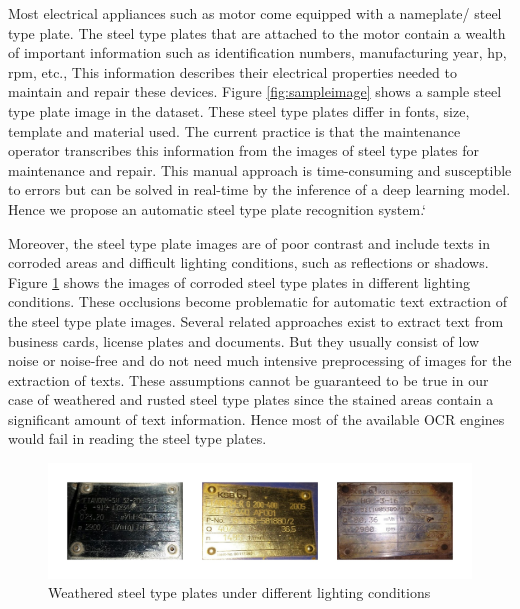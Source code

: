 		Most electrical appliances such as motor come equipped with a nameplate/ steel type plate. The steel type plates that are attached to the motor contain a wealth of important information such as identification numbers, manufacturing year, \gls{hp}, \gls{rpm}, etc., This information describes their electrical properties needed to maintain and repair these devices. Figure \ref{fig:sampleimage} shows a sample steel type plate image in the dataset. These steel type plates differ in fonts, size, template and material used. The current practice is that the maintenance operator transcribes this information from the images of steel type plates for maintenance and repair. This manual approach is time-consuming and susceptible to errors but can be solved in real-time by the inference of a deep learning model. Hence we propose an automatic steel type plate recognition system.`	
\newline		

	
		Moreover, the steel type plate images are of poor contrast and include texts in corroded areas and difficult lighting conditions, such as reflections or shadows. Figure \ref{fig:rusted} shows the images of corroded steel type plates in different lighting conditions. These occlusions become problematic for automatic text extraction of the steel type plate images. Several related approaches exist to extract text from business cards, license plates and documents. But they usually consist of low noise or noise-free and do not need much intensive preprocessing of images for the extraction of texts. These assumptions cannot be guaranteed to be true in our case of weathered and rusted steel type plates since the stained areas contain a significant amount of text information. Hence most of the available OCR engines would fail in reading the steel type plates.
\newline	
	 
\begin{figure}
\centering
\includegraphics[width=5.5in]{images/corrode.jpg}
\caption{Weathered steel type plates under different lighting conditions}
\label{fig:rusted}
\end{figure}

